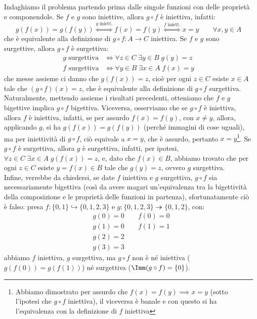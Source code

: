 \documentclass[11pt]{scrartcl}
\begin{document}
\begin{soln}
	Indaghiamo il problema partendo prima dalle singole funzioni con delle proprietà e componendole. Se $f$ e $g$ sono iniettive, allora $g \circ f$ è iniettiva, infatti:
	\[ g(f(x)) = g(f(y)) \overset{\text{$g$ iniett.}}{\iff} f(x) = f(y) \overset{\text{$f$ iniett.}}{\iff} x = y \qquad \forall x,y \in A
		\]
		che è equivalente alla definizione di $g \circ f : A \rightarrow C$ iniettiva. Se $f$ e $g$ sono surgettive, allora $g \circ f$ è surgettiva:
	\begin{align*}
		\text{$g$ surgettiva} &\iff \forall z \in C \; \exists y \in B \; g(y) = z \\
		\text{$f$ surgettiva} &\iff \forall y \in B \; \exists x \in A \; f(x) = y
	\end{align*}
	che messe assieme ci danno che $g(f(x)) = z$, cioè per ogni $z \in C$ esiste $x \in A$ tale che $(g \circ f)(x) = z$, che è equivalente alla definizione di $g \circ f$ surgettiva.
	Naturalmente, mettendo assieme i risultati precedenti, otteniamo che $f$ e $g$ bigettive implica $g \circ f$ bigettiva. Viceversa, osserviamo che se $g \circ f$ è iniettiva, allora $f$ è iniettiva,
	infatti, se per assurdo $f(x) = f(y)$, con $x \ne y$, allora, applicando $g$, si ha $g(f(x)) = g(f(y))$ (perché immagini di cose uguali), ma per iniettività di $g \circ f$, ciò equivale a $x = y$,
	che è assurdo, pertanto $x = y$\footnote{Abbiamo dimostrato per assurdo che $f(x) = f(y) \implies x = y$ (sotto l'ipotesi che $g \circ f$ iniettiva), il viceversa è banale e con questo si ha l'equivalenza con la definizione di $f$ iniettiva}.
	Se $g \circ f$ è surgettiva, allora $g$ è surgettiva, infatti, per ipotesi, $\forall z \in C \; \exists x \in A \; g(f(x)) = z$, e, dato che $f(x) \in B$, abbiamo trovato che per ogni $z \in C$ esiste $y = f(x) \in B$ tale che $g(y) = z$, ovvero $g$ surgettiva.\\
	Infine, verrebbe da chiedersi, se date $f$ iniettiva e $g$ surgettiva, $g \circ f$ sia necessariamente bigettiva (così da avere magari un'equivalenza tra la bigettività della composizione e le proprietà delle funzioni in partenza), sfortunatamente ciò è falso: presa
	$f : \{0,1\} \hookrightarrow \{0,1,2,3\}$ e $g : \{0,1,2,3\} \twoheadrightarrow \{0,1,2\}$, con:
	\begin{align*}
		& g(0) = 0 \qquad f(0) = 0 \\
		& g(1) = 0 \qquad f(1) = 1 \\
		& g(2) = 2 \\
		& g(3) = 3
	\end{align*}
	abbiamo $f$ iniettiva, $g$ surgettiva, ma $g \circ f$ non è né iniettiva ($g(f(0)) = g(f(1))$) né surgettiva ($\Imm(g \circ f) = \{0\}$).
\end{soln}
\end{document}

